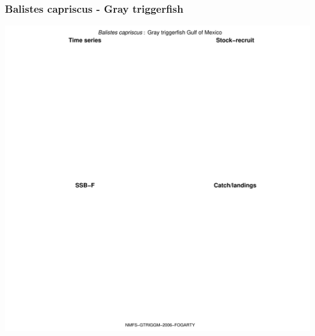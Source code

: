 \subsubsection{Balistes capriscus - Gray triggerfish}
\begin{center}
\includegraphics[width=1.2\textwidth]{../R/figures/NMFS-GTRIGGM-2006-FOGARTY.pdf}
\end{center}

